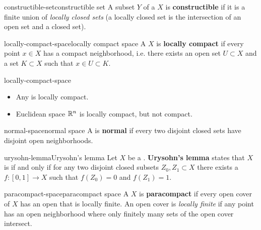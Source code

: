 \begin{topic}{constructible-set}{constructible set}
    A subset $Y$ of a  $X$ is \textbf{constructible} if it is a finite union of \textit{locally closed sets} (a locally closed set is the intersection of an open set and a closed set).
\end{topic}

\begin{topic}{locally-compact-space}{locally compact space}
    A  $X$ is \textbf{locally compact} if every point $x \in X$ has a compact neighborhood, i.e. there exists an open set $U \subset X$ and a  set $K \subset X$ such that $x \in U \subset K$.
\end{topic}

\begin{example}{locally-compact-space}
    \begin{itemize}
        \item Any  is locally compact.
        \item Euclidean space $\mathbb{R}^n$ is locally compact, but not compact.
    \end{itemize}
\end{example}

\begin{topic}{normal-space}{normal space}
    A  is \textbf{normal} if every two disjoint closed sets have disjoint open neighborhoods.
\end{topic}

\begin{topic}{urysohn-lemma}{Urysohn's lemma}
    Let $X$ be a . \textbf{Urysohn's lemma} states that $X$ is  if and only if for any two disjoint closed subsets $Z_0, Z_1 \subset X$ there exists a  $f \colon [0, 1] \to X$ such that $f(Z_0) = 0$ and $f(Z_1) = 1$.
\end{topic}

\begin{topic}{paracompact-space}{paracompact space}
    A  $X$ is \textbf{paracompact} if every open cover of $X$ has an open  that is locally finite. An open cover is \textit{locally finite} if any point has an open neighborhood where only finitely many sets of the open cover intersect.
\end{topic}

